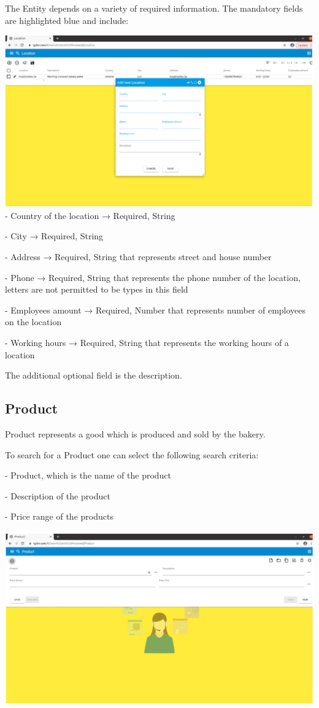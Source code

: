The Entity depends on a variety of required information. The mandatory fields are highlighted blue and include:

\includegraphics[width=\textwidth]{sections/01-chapter/images/location3.png}\\

- Country of the location → Required, String

- City → Required, String

- Address → Required, String that represents street and house number

- Phone → Required, String that represents the phone number of the location, letters are not permitted to be types in this field

- Employees amount → Required, Number that represents number of employees on the location

- Working hours → Required, String that represents the working hours of a location

The additional optional field is the description.

\subsection{Product}

Product represents a good which is produced and sold by the bakery.

To search for a Product one can select the following search criteria:

- Product, which is the name of the product

- Description of the product

- Price range of the products

\includegraphics[width=\textwidth]{sections/01-chapter/images/product1.png}\\


